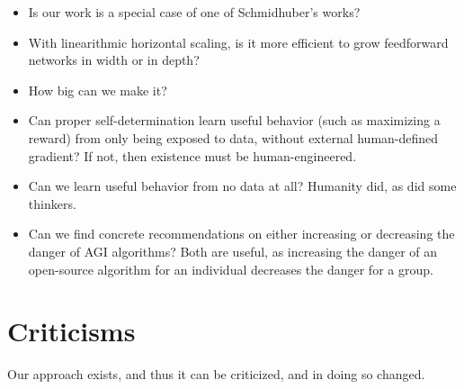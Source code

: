 \documentclass{article}
\begin{document}
\begin{itemize}
\item Is our work is a special case of one of Schmidhuber's works?

\item With linearithmic horizontal scaling, is it more efficient to grow feedforward networks in width or in depth?

\item How big can we make it?

\item Can proper self-determination learn useful behavior (such as maximizing a reward) from only being exposed to data, without external human-defined gradient? If not, then existence must be human-engineered.

\item Can we learn useful behavior from no data at all? Humanity did, as did some thinkers.

\item Can we find concrete recommendations on either increasing or decreasing the danger of AGI algorithms? Both are useful, as increasing the danger of an open-source algorithm for an individual decreases the danger for a group.
\end{itemize}

\section{Criticisms}

Our approach exists, and thus it can be criticized, and in doing so changed.
\end{document}
